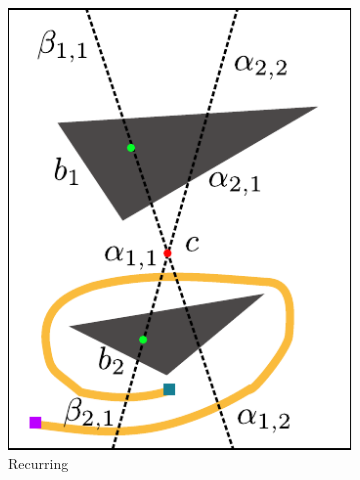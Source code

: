 \documentclass[letterpaper, 10 pt, conference]{ieeeconf}
\begin{document}
\begin{figure}
\begin{subfigure}[t]{0.4\linewidth}
		\includegraphics[width=\textwidth]{fig/recurring}
		\caption{Recurring}
		\label{fig:grammar:recurring}
	\end{subfigure}  
	\begin{subfigure}[t]{0.4\linewidth}
		\centering

\end{subfigure}
\end{figure}
\end{document}
